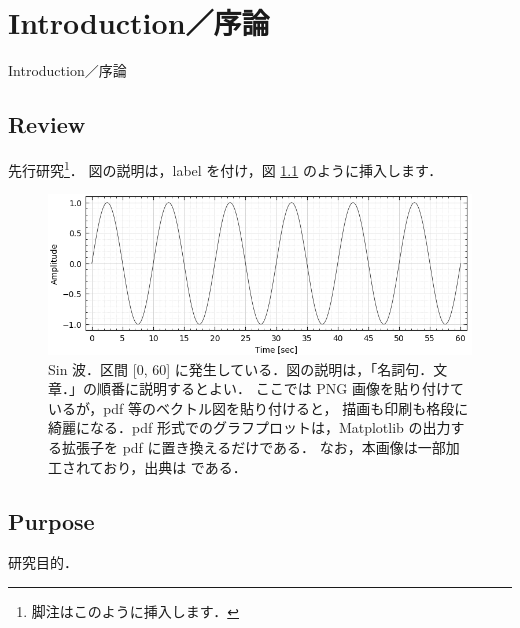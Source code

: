 \chapter{Introduction／序論}
\label{chap_Introduction}

Introduction／序論

\section{Review}
先行研究\footnote{脚注はこのように挿入します．}．
図の説明は，label を付け，図 \ref{fig_ADMIS2018} のように挿入します．

\begin{figure} %
  \centering
  \includegraphics[width=15cm]{./figs/sin.png}
  \caption{
    Sin 波．区間 [0, 60] に発生している．図の説明は，「名詞句．文章．」の順番に説明するとよい．
    ここでは PNG 画像を貼り付けているが，pdf 等のベクトル図を貼り付けると，
    描画も印刷も格段に綺麗になる．pdf 形式でのグラフプロットは，Matplotlib の出力する拡張子を pdf に置き換えるだけである．
    なお，本画像は一部加工されており，出典は \citep{ADMIS2018} である．
  }
  \label{fig_ADMIS2018}
\end{figure}

\section{Purpose}
研究目的．

